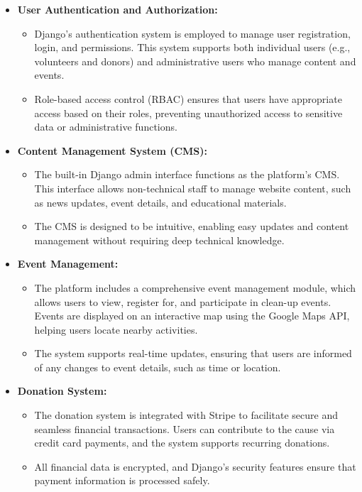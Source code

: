 \begin{itemize}
    \item \textbf{User Authentication and Authorization:}
    \begin{itemize}
        \item Django’s authentication system is employed to manage user registration, login, and permissions. This system supports both individual users (e.g., volunteers and donors) and administrative users who manage content and events.
        \item Role-based access control (RBAC) ensures that users have appropriate access based on their roles, preventing unauthorized access to sensitive data or administrative functions.
    \end{itemize}

    \item \textbf{Content Management System (CMS):}
    \begin{itemize}
        \item The built-in Django admin interface functions as the platform's CMS. This interface allows non-technical staff to manage website content, such as news updates, event details, and educational materials.
        \item The CMS is designed to be intuitive, enabling easy updates and content management without requiring deep technical knowledge.
    \end{itemize}

    \item \textbf{Event Management:}
    \begin{itemize}
        \item The platform includes a comprehensive event management module, which allows users to view, register for, and participate in clean-up events. Events are displayed on an interactive map using the Google Maps API, helping users locate nearby activities.
        \item The system supports real-time updates, ensuring that users are informed of any changes to event details, such as time or location.
    \end{itemize}

    \item \textbf{Donation System:}
    \begin{itemize}
        \item The donation system is integrated with Stripe to facilitate secure and seamless financial transactions. Users can contribute to the cause via credit card payments, and the system supports recurring donations.
        \item All financial data is encrypted, and Django’s security features ensure that payment information is processed safely.
    \end{itemize}


\end{itemize}
